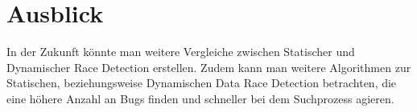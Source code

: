 \section{Ausblick}

In der Zukunft könnte man weitere Vergleiche zwischen Statischer und Dynamischer Race Detection erstellen. Zudem kann man weitere Algorithmen zur Statischen, beziehungsweise Dynamischen Data Race Detection betrachten, die eine höhere Anzahl an Bugs finden und schneller bei dem Suchprozess agieren.
